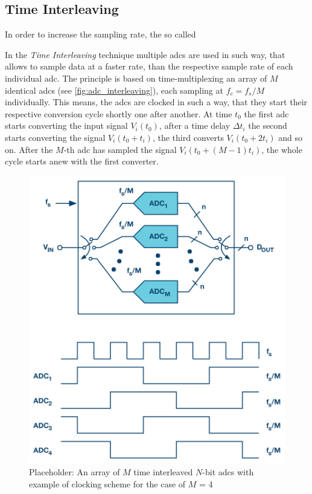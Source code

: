 \subsection{Time Interleaving}\label{sssec:time-interleaving}
In order to increase the sampling rate, the so called 

In the \textit{Time Interleaving} technique multiple \glspl{adc} are used in such way, that allows to sample data at a faster rate, than the respective sample rate of each individual \gls{adc}. The principle is based on time-multiplexing an array of $M$ identical \glspl{adc} (see \autoref{fig:adc_interleaving}), each sampling at $f_c = f_s/M$ individually. This means, the \glspl{adc} are clocked in such a way, that they start their respective conversion cycle shortly one after another. At time $t_0$ the first \gls{adc} starts converting the input signal $V_i(t_0)$, after a time delay $\Delta t_i$ the second starts converting the signal $V_i(t_0 + t_i)$, the third converts $V_i(t_0 + 2t_i)$ and so on. After the $M$-th \gls{adc} has sampled the signal $V_i(t_0 + (M-1)t_i)$, the whole cycle starts anew with the first converter. \cite{mangrob}
\begin{figure}[tbh]
	\centering
	\includegraphics[width = \textwidth]{chap/02-theory/img/adc_inter}
	\caption[Time Interleaving]{Placeholder: An array of $M$ time interleaved $N$-bit \glspl{adc} with example of clocking scheme for the case of $M$ = 4 \cite{mangrob}}
	\label{fig:adc_interleaving}
\end{figure}

